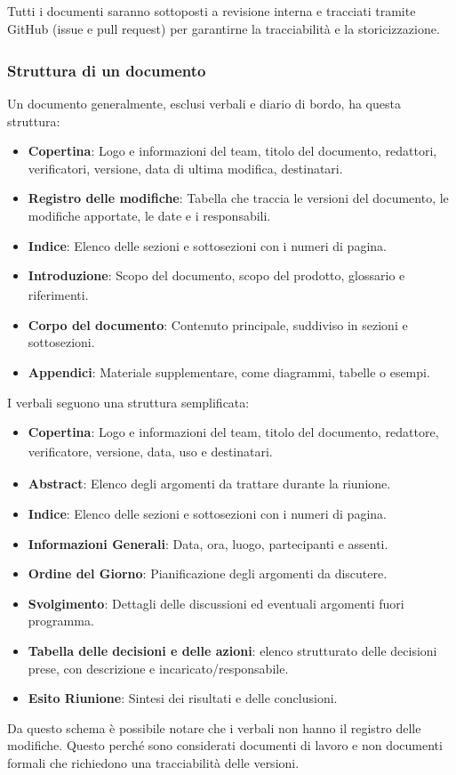 \documentclass[a4paper,11pt]{article}
\newcommand{\G}{\textsubscript{\scalebox{0.6}{\textbf{G}}}}
\begin{document}
Tutti i documenti saranno sottoposti a revisione interna e tracciati tramite GitHub\G{} 
(issue\G{} e pull request) per garantirne la tracciabilità\G{} e la storicizzazione.

\subsubsection{Struttura di un documento}
Un documento generalmente, esclusi verbali e diario di bordo, ha questa struttura:
\begin{itemize}
    \item \textbf{Copertina}: Logo e informazioni del team, titolo del documento, redattori, verificatori, versione, 
    data di ultima modifica, destinatari.
    \item \textbf{Registro delle modifiche}: Tabella che traccia le versioni del documento, le modifiche apportate,
     le date e i responsabili.
    \item \textbf{Indice}: Elenco delle sezioni e sottosezioni con i numeri di pagina.
    \item \textbf{Introduzione}: Scopo del documento, scopo del prodotto\G{}, glossario\G{} e riferimenti.
    \item \textbf{Corpo del documento}: Contenuto principale, suddiviso in sezioni e sottosezioni.
    \item \textbf{Appendici}: Materiale supplementare, come diagrammi, tabelle o esempi.
\end{itemize}

I verbali seguono una struttura semplificata:
\begin{itemize}
    \item \textbf{Copertina}: Logo e informazioni del team, titolo del documento, redattore\G{}, verificatore\G{}, 
     versione, data, uso e destinatari.
    \item \textbf{Abstract}: Elenco degli argomenti da trattare durante la riunione.
    \item \textbf{Indice}: Elenco delle sezioni e sottosezioni con i numeri di pagina.
    \item \textbf{Informazioni Generali}: Data, ora, luogo, partecipanti e assenti.
    \item \textbf{Ordine del Giorno}: Pianificazione degli argomenti da discutere.
    \item \textbf{Svolgimento}: Dettagli delle discussioni ed eventuali argomenti fuori programma.
    \item \textbf{Tabella delle decisioni e delle azioni}: elenco strutturato delle decisioni prese, con descrizione e incaricato/responsabile.
    \item \textbf{Esito Riunione}: Sintesi dei risultati e delle conclusioni.
\end{itemize}
Da questo schema è possibile notare che i verbali non hanno il registro delle modifiche. Questo perché sono considerati documenti di lavoro
e non documenti formali che richiedono una tracciabilità\G{} delle versioni.
\end{document}

